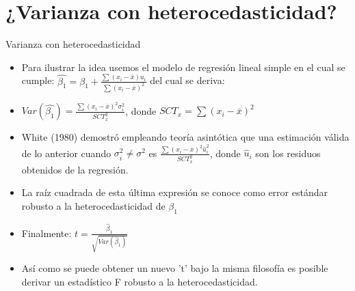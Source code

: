 \section[Varianza]{¿Varianza con heterocedasticidad?}

\begin{frame}{Varianza con heterocedasticidad}
	\begin{itemize}
		\item Para ilustrar la idea usemos el modelo de regresión lineal simple en el cual se cumple: $\hat{\beta_{1}}=\beta_{1}+\frac{\sum(x_{i}-\overline{x})u_{i}}{\sum(x_{i}-\overline{x})^{2}}$ del cual se deriva:
		\pause
		\item $Var(\hat{\beta_{1}})=\frac{\sum(x_{i}-\overline{x})^{2}\sigma_{i}^{2}}{SCT_{x}^{2}}$, donde $SCT_{x}=\sum(x_{i}-\overline{x})^{2}$
		\pause
		\item White (1980) demostró empleando teoría asintótica que una estimación válida de lo anterior cuando $\sigma_{i}^{2}\neq \sigma^{2}$ es $\frac{\sum(x_{i}-\overline{x})^{2}\hat{u}_{i}^{2}}{SCT_{x}^{2}}$, donde $\hat{u}_{i}$ son los residuos obtenidos de la regresión.
		\pause
		\item La raíz cuadrada de esta última expresión se conoce como error estándar robusto a la heterocedasticidad de $\beta_{1}$
		\pause
		\item Finalmente: $t=\frac{\hat\beta_1}{\sqrt{Var(\hat\beta_1)}}$
		\pause
		\item Así como se puede obtener un nuevo 't' bajo la misma filosofía es posible derivar un estadístico F robusto a la heterocedasticidad.
	\end{itemize}
\end{frame}

